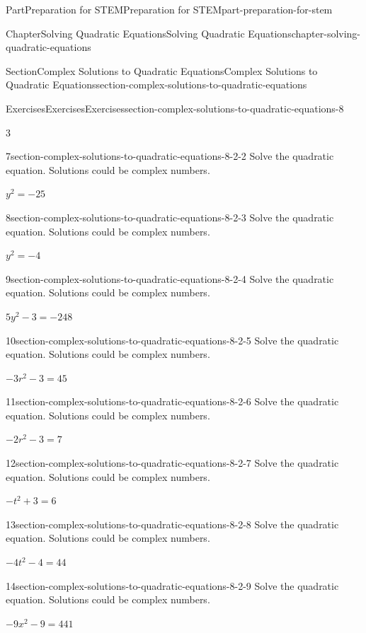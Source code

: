 \documentclass[twoside,10pt,]{book}
\numberwithin{equation}{section}
\begin{document}
\begin{partptx}{Part}{Preparation for STEM}{}{Preparation for STEM}{}{}{part-preparation-for-stem}
\begin{chapterptx}{Chapter}{Solving Quadratic Equations}{}{Solving Quadratic Equations}{}{}{chapter-solving-quadratic-equations}
\begin{sectionptx}{Section}{Complex Solutions to Quadratic Equations}{}{Complex Solutions to Quadratic Equations}{}{}{section-complex-solutions-to-quadratic-equations}
\begin{exercises-subsection}{Exercises}{Exercises}{}{Exercises}{}{}{section-complex-solutions-to-quadratic-equations-8}
\begin{exercisegroupcol}{3}
\begin{divisionexerciseegcol}{7}{}{}{section-complex-solutions-to-quadratic-equations-8-2-2}%
Solve the quadratic equation. Solutions could be complex numbers.%
\par
\(y^2 = -25\)%
\end{divisionexerciseegcol}%
\begin{divisionexerciseegcol}{8}{}{}{section-complex-solutions-to-quadratic-equations-8-2-3}%
Solve the quadratic equation. Solutions could be complex numbers.%
\par
\(y^2 = -4\)%
\end{divisionexerciseegcol}%
\begin{divisionexerciseegcol}{9}{}{}{section-complex-solutions-to-quadratic-equations-8-2-4}%
Solve the quadratic equation. Solutions could be complex numbers.%
\par
\(5y^2 - 3 = -248\)%
\end{divisionexerciseegcol}%
\begin{divisionexerciseegcol}{10}{}{}{section-complex-solutions-to-quadratic-equations-8-2-5}%
Solve the quadratic equation. Solutions could be complex numbers.%
\par
\(-3r^2 - 3 = 45\)%
\end{divisionexerciseegcol}%
\begin{divisionexerciseegcol}{11}{}{}{section-complex-solutions-to-quadratic-equations-8-2-6}%
Solve the quadratic equation. Solutions could be complex numbers.%
\par
\({-2r^{2}}  - 3 = 7\)%
\end{divisionexerciseegcol}%
\begin{divisionexerciseegcol}{12}{}{}{section-complex-solutions-to-quadratic-equations-8-2-7}%
Solve the quadratic equation. Solutions could be complex numbers.%
\par
\({-t^{2}} + 3 = 6\)%
\end{divisionexerciseegcol}%
\begin{divisionexerciseegcol}{13}{}{}{section-complex-solutions-to-quadratic-equations-8-2-8}%
Solve the quadratic equation. Solutions could be complex numbers.%
\par
\(-4t^2 - 4 = 44\)%
\end{divisionexerciseegcol}%
\begin{divisionexerciseegcol}{14}{}{}{section-complex-solutions-to-quadratic-equations-8-2-9}%
Solve the quadratic equation. Solutions could be complex numbers.%
\par
\(-9x^2 - 9 = 441\)%

\end{divisionexerciseegcol}
\end{exercisegroupcol}
\end{exercises-subsection}
\end{sectionptx}
\end{chapterptx}
\end{partptx}
\end{document}
